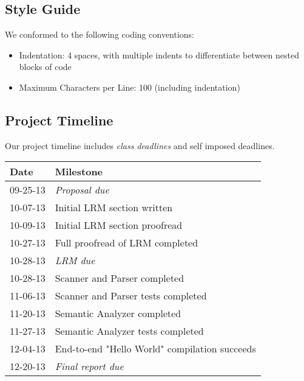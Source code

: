 	\subsection{Style Guide}
	We conformed to the following coding conventions:
		\begin{itemize}
		\item Indentation: 4 spaces, with multiple indents to differentiate between nested blocks of code 
		\item Maximum Characters per Line: 100 (including indentation)
		\end{itemize}
	
	\subsection{Project Timeline}
	Our project timeline includes \emph{class deadlines} and self imposed deadlines.
		\begin{table}[htdp]
		\begin{tabular}{|l|l|}
		\hline
		Date & Milestone \\ \hline
		09-25-13 & \emph{Proposal due} \\
		10-07-13 & Initial LRM section written \\
		10-09-13 & Initial LRM section proofread \\
		10-27-13 & Full proofread of LRM  completed \\
		10-28-13 & \emph{LRM due} \\
		10-28-13 & Scanner and Parser completed  \\
		11-06-13 & Scanner and Parser tests completed \\
		11-20-13 & Semantic Analyzer completed \\
		11-27-13 & Semantic Analyzer tests completed \\
		12-04-13 & End-to-end "Hello World" compilation succeeds \\
		12-20-13& \emph{Final report due} \\ 
		\hline
		\end{tabular}
		\end{table}
	\newpage	
